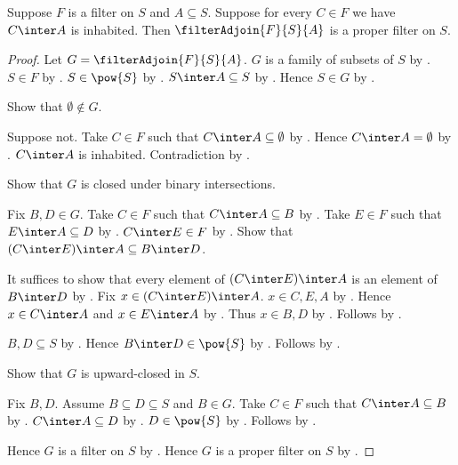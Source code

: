 \begin{proposition}\label{filter_adjoin_is_proper_filter}
    Suppose $F$ is a filter on $S$ and $A\subseteq S$.
    Suppose for every $C\in F$ we have $C\inter A$ is inhabited.
    Then $\filterAdjoin{F}{S}{A}$ is a proper filter on $S$.
\end{proposition}
\begin{proof}
    Let $G=\filterAdjoin{F}{S}{A}$.
    $G$ is a family of subsets of $S$
        by .
    $S\in F$ by .
    $S\in\pow{S}$ by .
    $S\inter A\subseteq S$ by .
    Hence $S\in G$ by .

    Show that $\emptyset\notin G$.
    \begin{subproof}
        Suppose not.
        Take $C\in F$ such that $C\inter A\subseteq\emptyset$
            by .
        Hence $C\inter A=\emptyset$
            by .
        $C\inter A$ is inhabited.
        Contradiction by .
    \end{subproof}

    Show that $G$ is closed under binary intersections.
    \begin{subproof}
        Fix $B,D\in G$.
        Take $C\in F$ such that $C\inter A\subseteq B$
            by .
        Take $E\in F$ such that $E\inter A\subseteq D$
            by .
        $C\inter E\in F$ by .
        Show that $(C\inter E)\inter A\subseteq B\inter D$.
        \begin{subproof}
            It suffices to show that every element of $(C\inter E)\inter A$
                is an element of $B\inter D$ by .
            Fix $x\in(C\inter E)\inter A$.
            $x\in C,E,A$ by .
            Hence $x\in C\inter A$ and $x\in E\inter A$
                by .
            Thus $x\in B,D$ by .
            Follows by .
        \end{subproof}
        $B,D\subseteq S$ by .
        Hence $B\inter D\in\pow{S}$
            by .
        Follows by .
    \end{subproof}

    Show that $G$ is upward-closed in $S$.
    \begin{subproof}
        Fix $B,D$.
        Assume $B\subseteq D\subseteq S$ and $B\in G$.
        Take $C\in F$ such that $C\inter A\subseteq B$
            by .
        $C\inter A\subseteq D$ by .
        $D\in\pow{S}$ by .
        Follows by .
    \end{subproof}
    Hence $G$ is a filter on $S$ by .
    Hence $G$ is a proper filter on $S$ by .
\end{proof}

